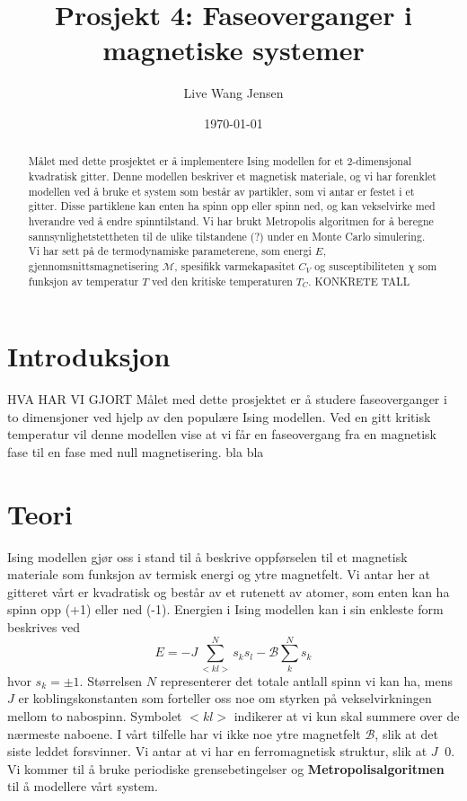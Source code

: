 \documentclass[11pt,a4paper]{article}
\begin{document}
\title{Prosjekt 4: Faseoverganger i magnetiske systemer }
\author{Live Wang Jensen}
\date{\today}

\maketitle

\begin{abstract}
Målet med dette prosjektet er å implementere Ising modellen for et 2-dimensjonal kvadratisk gitter. Denne modellen beskriver et magnetisk materiale, og vi har forenklet modellen ved å bruke et system som består av partikler, som vi antar er festet i et gitter. Disse partiklene kan enten ha spinn opp eller spinn ned, og kan vekselvirke med hverandre ved å endre spinntilstand. Vi har brukt Metropolis algoritmen for å beregne sannsynlighetstettheten til de ulike tilstandene (?) under en Monte Carlo simulering. Vi har sett på de termodynamiske parameterene, som energi $E$, gjennomsnittsmagnetisering $\mathcal{M}$, spesifikk varmekapasitet $C_V$ og susceptibiliteten $\chi$ som funksjon av temperatur $T$ ved den kritiske temperaturen $T_C$. KONKRETE TALL

\end{abstract}

\tableofcontents

\clearpage
\section{Introduksjon}
HVA HAR VI GJORT
Målet med dette prosjektet er å studere faseoverganger i to dimensjoner ved hjelp av den populære Ising modellen. Ved en gitt kritisk temperatur vil denne modellen vise at vi får en faseovergang fra en magnetisk fase til en fase med null magnetisering.
bla bla



\section{Teori}
Ising modellen gjør oss i stand til å beskrive oppførselen til et magnetisk materiale som funksjon av termisk energi og ytre magnetfelt. Vi antar her at gitteret vårt er kvadratisk og består av et rutenett av atomer, som enten kan ha spinn opp (+1) eller ned (-1). Energien i Ising modellen kan i sin enkleste form beskrives ved 
\begin{equation}
E = -J\sum_{<kl>}^N s_ks_l - \mathcal{ B} \sum_k^N s_k
\end{equation}
hvor $s_k = \pm 1$. Størrelsen $N$ representerer det totale antlall spinn vi kan ha, mens $J$ er koblingskonstanten som forteller oss noe om styrken på vekselvirkningen mellom to nabospinn. Symbolet $<kl>$ indikerer at vi kun skal summere over de nærmeste naboene. I vårt tilfelle har vi ikke noe ytre magnetfelt $\mathcal{B}$, slik at det siste leddet forsvinner. Vi antar at vi har en ferromagnetisk struktur, slik at $J \>$ 0. Vi kommer til å bruke periodiske grensebetingelser og \textbf{Metropolisalgoritmen} til å modellere vårt system. \\
\end{document}
